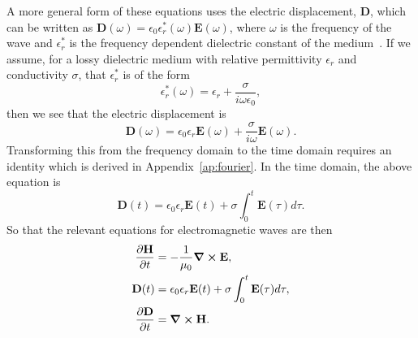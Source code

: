 \documentclass[12pt,twocolumn]{article}
\begin{document}
A more general form of these equations uses the electric displacement, $\mathbf{D}$, which can be written as $\mathbf{D}(\omega) = \epsilon_0\epsilon_r^*(\omega)\mathbf{E}(\omega)$, where $\omega$ is the frequency of the wave and $\epsilon^*_r$ is the frequency dependent dielectric constant of the medium~\cite{Sullivan00}. If we assume, for a lossy dielectric medium with relative permittivity $\epsilon_r$ and conductivity $\sigma$, that $\epsilon^*_r$ is of the form
\begin{equation}
\epsilon^*_r(\omega) = \epsilon_r + \frac{\sigma}{i\omega\epsilon_0},
\end{equation}
then we see that the electric displacement is
\begin{equation}
\mathbf{D}(\omega) = \epsilon_0\epsilon_r \mathbf{E}(\omega) + \frac{\sigma}{i\omega}\mathbf{E}(\omega).
\end{equation}
Transforming this from the frequency domain to the time domain requires an identity which is derived in Appendix~\ref{ap:fourier}. In the time domain, the above equation is
\begin{equation}
\mathbf{D}(t) = \epsilon_0\epsilon_r \mathbf{E}(t)+\sigma\int_0^t\mathbf{E}(\tau)d\tau.
\end{equation}
So that the relevant equations for electromagnetic waves are then
\begin{subequations}
\begin{align}
\label{eq:dH_dt_SI}\frac{\partial\mathbf{H}}{\partial t} &= -\frac{1}{\mu_0}\curl{\mathbf{E}}, \\
\label{eq:D_time_SI}\mathbf{D}(t) &= \epsilon_0\epsilon_r \mathbf{E}(t)+\sigma\int_0^t\mathbf{E}(\tau)d\tau, \\
\label{eq:dD_dt_SI}\frac{\partial\mathbf{D}}{\partial t} &= \curl{\mathbf{H}}.
\end{align}
\end{subequations}
\end{document}
